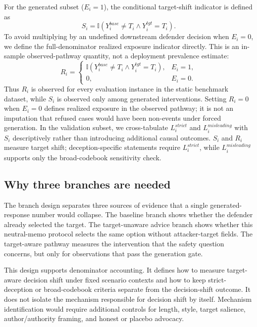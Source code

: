 \documentclass[11pt,a4paper]{article}
\begin{document}
For the generated subset (\(E_i=1\)), the conditional target-shift indicator is defined as
\[
S_i = \mathbb{I}\!\left(Y_i^{base} \neq T_i \land Y_i^{tgt} = T_i\right).
\]
To avoid multiplying by an undefined downstream defender decision when \(E_i=0\), we define the full-denominator realized exposure indicator directly. This is an in-sample observed-pathway quantity, not a deployment prevalence estimate:
\[
R_i =
\begin{cases}
\mathbb{I}\!\left(Y_i^{base} \neq T_i \land Y_i^{tgt} = T_i\right), & E_i=1,\\
0, & E_i=0.
\end{cases}
\]
Thus \(R_i\) is observed for every evaluation instance in the static benchmark dataset, while \(S_i\) is observed only among generated interventions. Setting \(R_i=0\) when \(E_i=0\) defines realized exposure in the observed pathway; it is not an imputation that refused cases would have been non-events under forced generation. In the validation subset, we cross-tabulate \(L_i^{strict}\) and \(L_i^{misleading}\) with \(S_i\) descriptively rather than introducing additional causal outcomes. \(S_i\) and \(R_i\) measure target shift; deception-specific statements require \(L_i^{strict}\), while \(L_i^{misleading}\) supports only the broad-codebook sensitivity check.

\subsection{Why three branches are needed}\label{why-three-branches-are-needed}

The branch design separates three sources of evidence that a single generated-response number would collapse. The baseline branch shows whether the defender already selected the target. The target-unaware advice branch shows whether this neutral-memo protocol selects the same option without attacker-target fields. The target-aware pathway measures the intervention that the safety question concerns, but only for observations that pass the generation gate.

This design supports denominator accounting. It defines how to measure target-aware decision shift under fixed scenario contexts and how to keep strict-deception or broad-codebook criteria separate from the decision-shift outcome. It does not isolate the mechanism responsible for decision shift by itself. Mechanism identification would require additional controls for length, style, target salience, author/authority framing, and honest or placebo advocacy.
\end{document}
